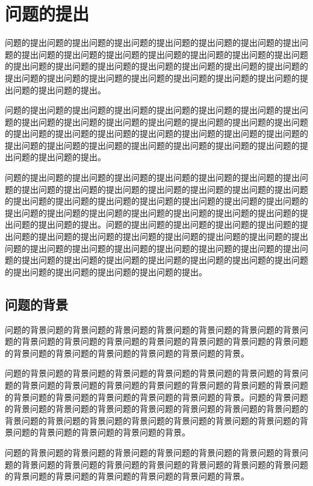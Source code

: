 \documentclass{MMCStyle}
\begin{document}
	\section{问题的提出}
问题的\cite{石润2023基于}提出问题的提出问题的提出问题的提出问题的提出问题的提出问题的提出问题的提出问题的提出问题的提出问题的提出问题的提出问题的提出问题的提出问题的提出问题的提出问题的提出问题的提出问题的提\cite{石润2023凤仙花种子包衣载体固定化微生物修复石油烃污染土壤的效应}出问题的提出问题的提出问题的提出问题的提出问题的提出问题的提出问题的提出问题的提出问题的提出问题\cite{李韵诗2015重金属污染土壤植物修复中的微生物功能研究进展}的提出问题\cite{AAAAAA}的提出问题的提出。
 
 问题的提出问题的提出问题的提出问题的提出问题的提出问题的提出问题的提出问题的提出问题的提出问题的提出问题的提出问题的提出问题的提出问题的提出问题的提出问题的提出问题的提出问题的提出问题的提出问题的提出问题的提出问题的提出问题的提出问题的提出问题的提出问题的提出问题的提出问题的提出问题的提出问题的提出问题的提出。
 
 问题的提出问题的提出问题的提出问题的提出问题的提出问题的提出问题的提出问题的提出问题的提出问题的提出问题的提出问题的提出问题的提出问题的提出问题的提出问题的提出问题的提出问题的提出问题的提出问题的提出问题的提出问题的提出问题的提出问题的提出问题的提出问题的提出问题的提出问题的提出问题的提出问题的提出问题的提出。问题的提出问题的提出问题的提出问题的提出问题的提出问题的提出问题的提出问题的提出问题的提出问题的提出问题的提出问题的提出问题的提出问题的提出问题的提出问题的提出问题的提出问题的提出问题的提出问题的提出问题的提出问题的提出问题的提出问题的提出问题的提出问题的提出问题的提出问题的提出问题的提出问题的提出问题的提出。
 
	\subsection{问题的背景}
问题的背景问题的背景问题的背景问题的背景问题的背景问题的背景问题的背景问题的背景问题的背景问题的背景问题的背景问题的背景问题的背景问题的背景问题的背景问题的背景问题的背景问题的背景问题的背景问题的背景。

问题的背景问题的背景问题的背景问题的背景问题的背景问题的背景问题的背景问题的背景问题的背景问题的背景问题的背景问题的背景问题的背景问题的背景问题的背景问题的背景问题的背景问题的背景问题的背景问题的背景。问题的背景问题的背景问题的背景问题的背景问题的背景问题的背景问题的背景问题的背景问题的背景问题的背景问题的背景问题的背景问题的背景问题的背景问题的背景问题的背景问题的背景问题的背景问题的背景问题的背景。

问题的背景问题的背景问题的背景问题的背景问题的背景问题的背景问题的背景问题的背景问题的背景问题的背景问题的背景问题的背景问题的背景问题的背景问题的背景问题的背景问题的背景问题的背景问题的背景问题的背景。
\end{document}
